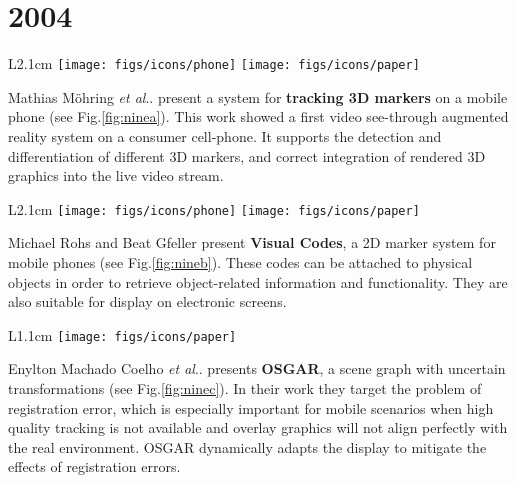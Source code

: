 \documentclass[12pt,a4paper]{article}
\makeatletter
\DeclareRobustCommand\onedot{\futurelet\@let@token\@onedot}
\def\@onedot{\ifx\@let@token.\else.\null\fi\xspace}
\def\etal{\emph{et al}\onedot}
\makeatother
\begin{document}
\vspace{-5pt}
\section*{2004}

\begin{wrapfigure}{L}{2.1cm}
	\vspace{-15pt}	
	\texttt{[image: figs/icons/phone]}
	\texttt{[image: figs/icons/paper]}	
	\vspace{-25pt}		
\end{wrapfigure}
Mathias M\"ohring \etal present a system for \textbf{tracking 3D markers} on a mobile phone \cite{Mohring04} (see Fig.\ref{fig:ninea}). This work showed a first video see-through augmented reality system on a consumer cell-phone. It supports the detection and differentiation of different 3D markers, and correct integration of rendered 3D graphics into the live video stream.

\vspace{0.1in}

\begin{wrapfigure}{L}{2.1cm}
	\vspace{-15pt}	
	\texttt{[image: figs/icons/phone]}
	\texttt{[image: figs/icons/paper]}	
	\vspace{-25pt}		
\end{wrapfigure}
\noindent Michael Rohs and Beat Gfeller present \textbf{Visual Codes}, a 2D marker system for mobile phones \cite{Rohs04} (see Fig.\ref{fig:nineb}). These codes can be attached to physical objects in order to retrieve object-related information and functionality. They are also suitable for display on electronic screens.

\vspace{0.1in}

\begin{wrapfigure}{L}{1.1cm}
	\vspace{-10pt}	
	\texttt{[image: figs/icons/paper]}	
	\vspace{-10pt}		
\end{wrapfigure}
\noindent Enylton Machado Coelho \etal presents \textbf{OSGAR}, a scene graph with uncertain transformations \cite{Coelho04} (see Fig.\ref{fig:ninec}). In their work they target the problem of registration error, which is especially important for mobile scenarios when high quality tracking is not available and overlay graphics will not align perfectly with the real environment. OSGAR dynamically adapts the display to mitigate the effects of registration errors.
\end{document}
